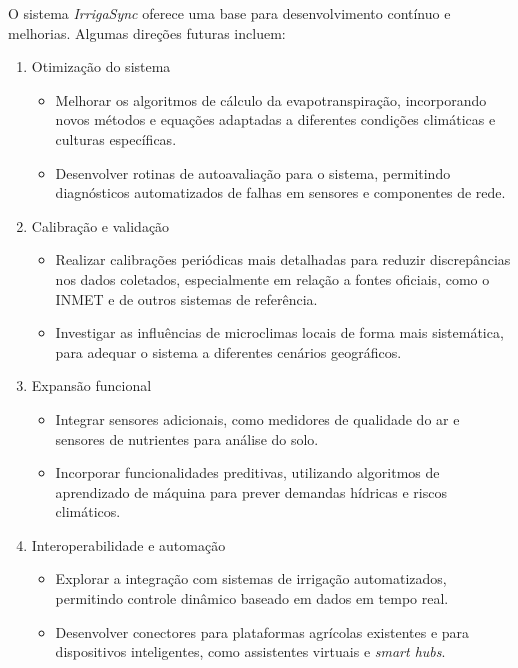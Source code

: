O sistema \textit{IrrigaSync} oferece uma base para desenvolvimento contínuo e melhorias. Algumas direções futuras incluem:  

\begin{enumerate}
    \item Otimização do sistema
        \begin{itemize}
            \item Melhorar os algoritmos de cálculo da evapotranspiração, incorporando novos métodos e equações adaptadas a diferentes condições climáticas e culturas específicas.  
            \item Desenvolver rotinas de autoavaliação para o sistema, permitindo diagnósticos automatizados de falhas em sensores e componentes de rede.  
        \end{itemize}
    \item Calibração e validação
        \begin{itemize}
            \item Realizar calibrações periódicas mais detalhadas para reduzir discrepâncias nos dados coletados, especialmente em relação a fontes oficiais, como o INMET e de outros sistemas de referência. 
            \item Investigar as influências de microclimas locais de forma mais sistemática, para adequar o sistema a diferentes cenários geográficos.  
        \end{itemize}
    \item Expansão funcional  
        \begin{itemize}
            \item Integrar sensores adicionais, como medidores de qualidade do ar e sensores de nutrientes para análise do solo.  
            \item Incorporar funcionalidades preditivas, utilizando algoritmos de aprendizado de máquina para prever demandas hídricas e riscos climáticos.  
        \end{itemize}
    \item Interoperabilidade e automação  
        \begin{itemize}
            \item Explorar a integração com sistemas de irrigação automatizados, permitindo controle dinâmico baseado em dados em tempo real.  
            \item Desenvolver conectores para plataformas agrícolas existentes e para dispositivos inteligentes, como assistentes virtuais e \textit{smart hubs}.  
        \end{itemize}

\end{enumerate}
